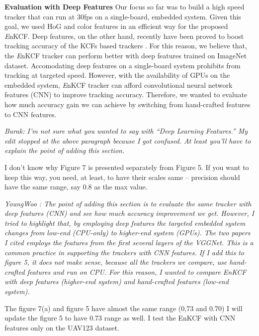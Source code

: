 \documentclass[10pt,twocolumn,letterpaper]{article}
\begin{document}
\textbf{Evaluation with Deep Features} Our focus so far was to build a high
speed tracker that can run at 30fps on a single-board, embedded
system. Given this goal, we used HoG and color features in an
efficient way for the proposed {\it E}nKCF. Deep features, on
the other hand, recently have been proved to boost tracking accuracy
of the KCFs based trackers \cite{ma2015hierarchical,
  danelljan2015convolutional}. For this reason, we believe that, the
{\it E}nKCF tracker can perform better with deep features trained
on ImageNet dataset. Accomodating deep features on a single-board
system prohibits from tracking at targeted speed. However, with the
availability of GPUs on the embedded system, {\it E}nKCF tracker can
afford convolutional neural network features (CNN) to improve tracking
accuracy. Therefore, we wanted to evaluate how much accuracy gain we
can achieve by switching from hand-crafted features to CNN features.

{\it Burak: I'm not sure what you wanted to say with ``Deep Learning
  Features.'' My edit stopped at the above paragraph because I got
  confused. At least you'll have to explain the point of adding this
  section.

  I don't know why Figure 7 is presented separately from Figure 5. If
  you want to keep this way, you need, at least, to have their scales
  same -- precision should have the same range, say 0.8 as the max
  value.

  \it YoungWoo : The point of adding this section is to evaluate the
  same tracker with deep features (CNN) and see how much accuracy improvement
  we get. However, I tried to highlight that, by employing deep features
  the targeted embedded system changes from low-end (CPU-only) to 
  higher-end system (GPUs). The two papers I cited employs the features
  from the first several layers of the VGGNet. This is a common practice
  in supporting the trackers with CNN features. If I add this to figure 5,
  it does not make sense, because all the trackers we compare, use hand-crafted
  features and run on CPU. For this reason, I wanted to compare EnKCF 
  with deep features (higher-end system) and hand-crafted features (low-end system).
 
  The figure 7(a) and figure 5 have almost the same range (0,73 and 0.70)
  I will update the figure 5 to have 0.73 range as well. I test the EnKCF
  with CNN features only on the UAV123 dataset.
}
\end{document}
